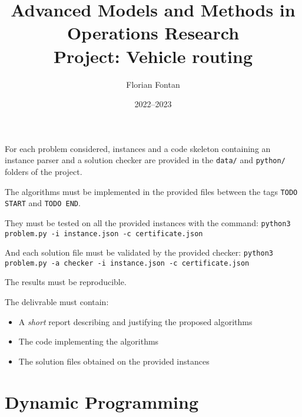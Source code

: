 \documentclass[a4paper,twocolumn]{article}
\author{Florian Fontan}
\title{Advanced Models and Methods in Operations Research \\ Project: Vehicle routing}
\date{2022--2023}
\begin{document}
\maketitle

For each problem considered, instances and a code skeleton containing an instance parser and a solution checker are provided in the \texttt{data/} and \texttt{python/} folders of the project.

The algorithms must be implemented in the provided files between the tags \texttt{TODO START} and \texttt{TODO END}.

They must be tested on all the provided instances with the command:
\texttt{python3 problem.py -i instance.json -c certificate.json}

And each solution file must be validated by the provided checker:
\texttt{python3 problem.py -a checker -i instance.json -c certificate.json}

The results must be reproducible.

\bigskip

The delivrable must contain:
\begin{itemize}
  \item A \emph{short} report describing and justifying the proposed algorithms
  \item The code implementing the algorithms
  \item The solution files obtained on the provided instances
\end{itemize}

\section{Dynamic Programming}
\end{document}
